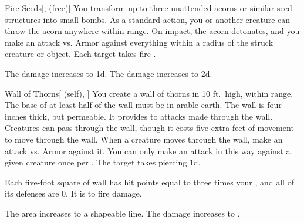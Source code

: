 \lowercase{\hypertarget{spell:Fire Seeds}{}}\label{spell:Fire Seeds}
\begin{freeability}[Rank 3]{\hypertarget{spell:Fire Seeds}{Fire Seeds}}[,  (free)]
You transform up to three unattended acorns or similar seed structures into small bombs.
As a standard action, you or another creature can throw the acorn anywhere within \rngclose range.
On impact, the acorn detonates, and you make an attack vs. Armor against everything within a \areasmall radius of the struck creature or object.
\hit Each target takes fire .

\rankline
{} The damage increases to  \plus1d.
 The damage increases to  \plus2d.
\end{freeability}
\vspace{0.25em}



\lowercase{\hypertarget{spell:Wall of Thorns}{}}\label{spell:Wall of Thorns}
\begin{attuneability}[Rank 3]{\hypertarget{spell:Wall of Thorns}{Wall of Thorns}}[ (self), ]
You create a wall of thorns in 10 ft.\ high, \areamed {} within \rngmed range.
The base of at least half of the wall must be in arable earth.
The wall is four inches thick, but permeable.
It provides  to attacks made through the wall.
Creatures can pass through the wall, though it costs five extra feet of movement to move through the wall.
When a creature moves through the wall, make an attack vs. Armor against it.
You can only make an attack in this way against a given creature once per .
\hit The target takes piercing  \minus1d.

Each five-foot square of wall has hit points equal to three times your , and all of its defenses are 0.
It is  to fire damage.

\rankline
{} The area increases to a \arealarge shapeable line.
 The damage increases to .
\end{attuneability}
\vspace{0.25em}



